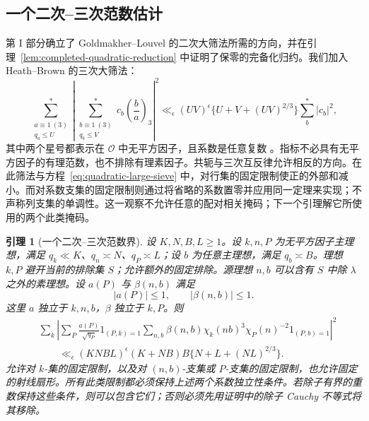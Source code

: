 \documentclass[11pt,a4paper]{article}
\numberwithin{equation}{section}
\numberwithin{figure}{section}
\newtheorem{lemma}[theorem]{引理}
\theoremstyle{definition}
\theoremstyle{remark}
\begin{document}
\subsection{一个二次--三次范数估计}

第 I 部分确立了 Goldmakher--Louvel 的二次大筛法所需的方向，并在引理~\ref{lem:completed-quadratic-reduction} 中证明了保零的完备化归约。我们加入 Heath--Brown 的三次大筛法：
\begin{equation}\label{eq:cubic-large-sieve}
 \sum_{\substack{a\equiv1\ (3)\\q_a\le U}}^{*}
 \left|\sum_{\substack{b\equiv1\ (3)\\q_b\le V}}^{*}
           c_b\left(\frac ba\right)_3\right|^2
 \ll_\epsilon (UV)^\epsilon
       \{U+V+(UV)^{2/3}\}\sum_b^{*}|c_b|^2,
\end{equation}
其中两个星号都表示在 \(\mathcal O\) 中无平方因子，且系数是任意复数 \cite[定理 2]{HB}。指标不必具有无平方因子的有理范数，也不排除有理素因子。共轭与三次互反律允许相反的方向。在此筛法与方程~\eqref{eq:quadratic-large-sieve} 中，对行集的固定限制使正的外部和减小。而对系数支集的固定限制则通过将省略的系数置零并应用同一定理来实现；不声称列支集的单调性。这一观察不允许任意的配对相关掩码；下一个引理解它所使用的两个此类掩码。

\begin{lemma}[一个二次--三次范数界]\label{lem:hybrid-energy}
设 \(K,N,B,L\ge1\)。设 \(k,n,P\) 为无平方因子主理想，满足 \(q_k\ll K\)、\(q_n\asymp N\)、\(q_P\asymp L\)；设 \(b\) 为任意主理想，满足 \(q_b\asymp B\)。理想 \(k,P\) 避开当前的排除集 \(S\)；允许额外的固定排除。源理想 \(n,b\) 可以含有 \(S\) 中除 \(\lambda\) 之外的素理想。设 \(a(P)\) 与 \(\beta(n,b)\) 满足
\[
 |a(P)|\le1,\qquad |\beta(n,b)|\le1.
\]
这里 \(a\) 独立于 \(k,n,b\)，\(\beta\) 独立于 \(k,P\)。则
\begin{equation}\label{old-eq:4.6b}
 \begin{split}
 &\sum_k\left|
 \sum_P\frac{a(P)}{\sqrt{q_P}}1_{(P,k)=1}
 \sum_{n,b}\beta(n,b)\chi_k(nb)^3
                 \chi_P(n)^{-2}1_{(P,b)=1}
 \right|^2\\
 &\qquad\ll_\epsilon
 (KNBL)^\epsilon(K+NB)B\{N+L+(NL)^{2/3}\}.
 \end{split}
\end{equation}
允许对 \(k\)-集的固定限制，以及对 \((n,b)\)-支集或 \(P\)-支集的固定限制，也允许固定的射线扇形。所有此类限制都必须保持上述两个系数独立性条件。若除子有界的重数保持这些条件，则可以包含它们；否则必须先用证明中的除子 Cauchy 不等式将其移除。
\end{lemma}
\end{document}
